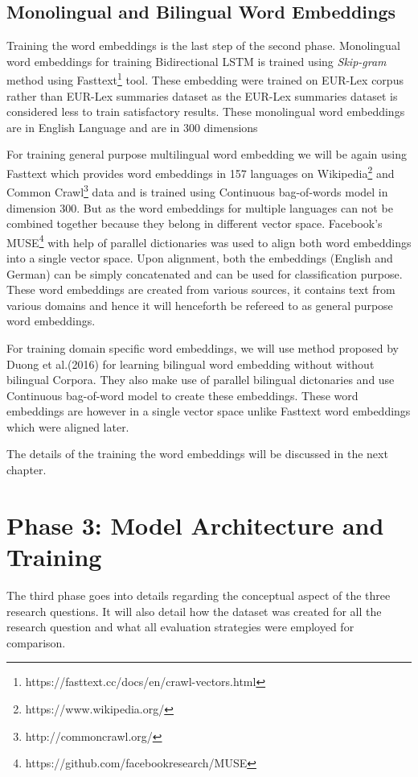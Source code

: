 \subsection*{Monolingual and Bilingual Word Embeddings}

Training the word embeddings is the last step of the second phase. Monolingual word embeddings for training Bidirectional LSTM is trained using \textit{Skip-gram} method using Fasttext\footnote{https://fasttext.cc/docs/en/crawl-vectors.html}\cite{graves2009novel} tool. These embedding were trained on EUR-Lex corpus rather than EUR-Lex summaries dataset as the EUR-Lex summaries dataset is considered less to train satisfactory results. These monolingual word embeddings are in English Language and are in 300 dimensions

For training general purpose multilingual word embedding we will be again using Fasttext which provides word embeddings in 157 languages on Wikipedia\footnote{https://www.wikipedia.org/} and Common Crawl\footnote{http://commoncrawl.org/} data and is trained using Continuous bag-of-words model in dimension 300. But as the word embeddings for multiple languages can not be combined together because they belong in different vector space. Facebook's MUSE\footnote{https://github.com/facebookresearch/MUSE} \cite{conneau2017word} with help of parallel dictionaries was used to align both word embeddings into a single vector space. Upon alignment, both the embeddings (English and German) can be simply concatenated and can be used for classification purpose. These word embeddings are created from various sources, it contains text from various domains and hence it will henceforth be refereed to as general purpose word embeddings.

For training domain specific word embeddings, we will use method proposed by Duong et al.(2016)\cite{duong-EtAl:2016:EMNLP} for learning bilingual word embedding without without bilingual Corpora. They also make use of parallel bilingual dictonaries and use Continuous bag-of-word model to create these embeddings. These word embeddings are however in a single vector space unlike Fasttext word embeddings which were aligned later.

The details of the training the word embeddings will be discussed in the next chapter.

\section{Phase 3: Model Architecture and Training}\label{sec:conceptRQ}
The third phase goes into details regarding the conceptual aspect of the three research questions. It will also detail how the dataset was created for all the research question and what all evaluation strategies were employed for comparison. 



